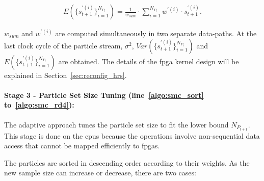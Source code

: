 \begin{equation}
\begin{aligned}
E(\{s_{t+1}^{\prime(i)}\}^{N_{P_t}}_{i=1}) = \frac{1}{w_{sum}} \cdot \sum_{i=1}^{N_{P_t}} w^{\prime(i)} \cdot s_{t+1}^{\prime(i)} \mbox{.}
\end{aligned}
\label{eqt:bound8}
\end{equation}

$w_{sum}$ and $w^{\prime(i)}$ are computed simultaneously in two separate data-paths.
At the last clock cycle of the particle stream, $\sigma^2$, $Var(\{s_{t+1}^{\prime(i)}\}^{N_{P_t}}_{i=1})$ and $E(\{s_{t+1}^{\prime(i)}\}^{N_{P_t}}_{i=1})$ are obtained.
The details of the \gls{fpga} kernel design will be explained in Section~\ref{sec:reconfig_hrs}.


\paragraph{Stage 3 - Particle Set Size Tuning (line~\ref{algo:smc_sort} to~\ref{algo:smc_rd4}): }

The adaptive approach tunes the particle set size to fit the lower bound ${N_{P_{t+1}}}$.
This stage is done on the \glspl{cpu} because the operations involve non-sequential data access that cannot be mapped efficiently to \glspl{fpga}.

The particles are sorted in descending order according to their weights.
As the new sample size can increase or decrease, there are two cases:

